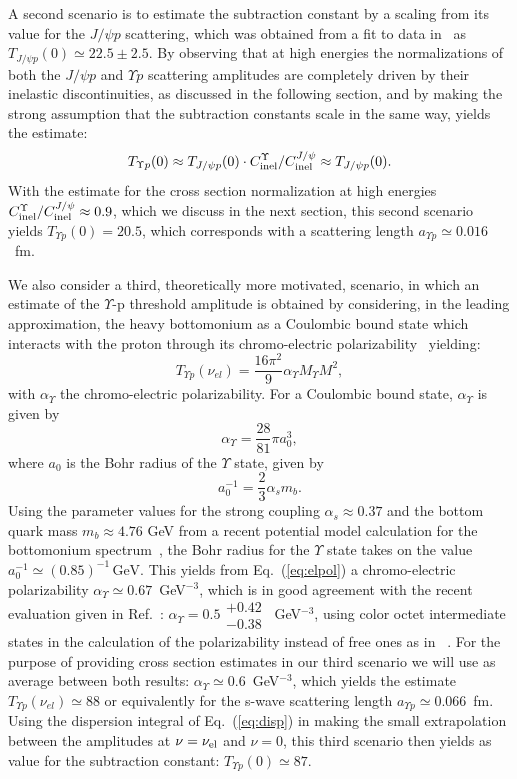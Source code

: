 \documentclass[prd,amsmath,%
twocolumn,floatfix,amssymb, preprintnumbers, linenumbers,nofootinbib, superscriptaddress]{revtex4}
\newcommand{\beq}{\begin{equation}}
\newcommand{\eeq}{\end{equation}}
\begin{document}
A second scenario is to estimate the subtraction constant by a scaling from its value for the $J/\psi p$ scattering, which was obtained from a fit to data in~\cite{Gryniuk:2016mpk} as $T_{J/\psi p }(0) \simeq 22.5 \pm 2.5$. 
By observing that at high energies the normalizations of both the $J/\psi p$ and $\Upsilon p$ scattering amplitudes are completely driven by their inelastic discontinuities, as discussed in the following section, and by making the strong assumption that the subtraction constants scale in the same way, yields the estimate: 
\beq
T_{\Upsilon p}(0) \approx T_{J/\psi p }(0) \cdot C_{\rm inel}^\Upsilon / C_{\rm inel}^{J/\psi} \approx T_{J/\psi p }(0).
\eeq
With the estimate for the cross section normalization 
at high energies  
$C_{\rm inel}^\Upsilon / C_{\rm inel}^{J/\psi} \approx 0.9$, which we discuss in the next section, this second scenario yields $T_{\Upsilon p}(0) = 20.5$, which corresponds with a scattering length $a_{\Upsilon p} \simeq 0.016$~fm. 

We also consider a third, theoretically more motivated, scenario, in which an estimate of the $\Upsilon$-p threshold amplitude is obtained by considering, in the leading approximation,  the heavy bottomonium 
as a Coulombic bound state which interacts with the proton through its chromo-electric polarizability~\cite{Peskin:1979va} yielding:
\beq
T_{\Upsilon p}(\nu_{el}) = \frac{16\pi^2}{9} \alpha_\Upsilon M_{\Upsilon} M^2,
\eeq
with $\alpha_\Upsilon$ the chromo-electric polarizability.  
For a Coulombic bound state, $\alpha_\Upsilon$ is given by~\cite{Peskin:1979va,Bhanot:1979vb}
\beq
\alpha_\Upsilon = \frac{28}{81} \pi a_0^3,
\label{eq:elpol}
\eeq
where $a_0$ is the Bohr radius of the $\Upsilon$ state, given by
\beq
a_0^{-1} = \frac{2}{3}\alpha_s m_b.
\eeq
Using the parameter values for the strong coupling $\alpha_s\approx 0.37$ and the bottom quark mass $m_b\approx 4.76$ GeV from a recent potential model calculation for the bottomonium spectrum~\cite{Deng:2016ktl}, the Bohr radius for the $\Upsilon$ state takes on the value
$a_0^{-1} \simeq (0.85)^{-1} \,\mathrm{GeV}$. 
This yields from Eq.~(\ref{eq:elpol}) a chromo-electric polarizability $\alpha_\Upsilon \simeq 0.67$~GeV$^{-3}$, which is in good agreement with the recent evaluation given in Ref.~\cite{Brambilla:2015rqa}: 
$\alpha_\Upsilon = 0.5 \substack{+0.42 \\ -0.38}$~GeV$^{-3}$, using color octet intermediate states in the calculation of the polarizability instead of free ones as in ~\cite{Peskin:1979va,Bhanot:1979vb}. For the purpose of providing cross section estimates in our third scenario we will use as average between both results: $\alpha_\Upsilon \simeq 0.6$~GeV$^{-3}$, 
which yields the estimate $T_{\Upsilon p}(\nu_{el}) \simeq 88$ or equivalently for the s-wave scattering length $a_{\Upsilon p} \simeq 0.066$~fm. Using the dispersion integral of Eq.~(\ref{eq:disp}) in making the small extrapolation between the amplitudes at $\nu = \nu_{\rm el}$ and $\nu = 0$, this third scenario then yields as value for the subtraction constant: $T_{\Upsilon p}(0) \simeq 87$. 
\end{document}
